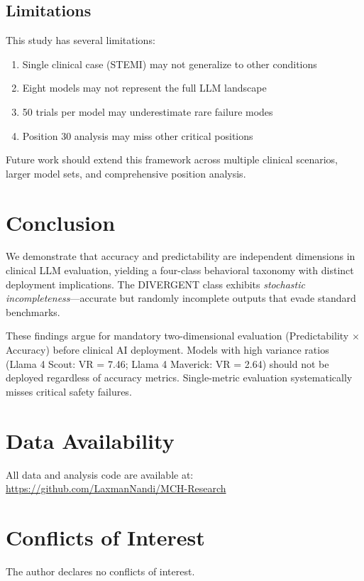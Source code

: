 \documentclass[11pt]{article}
\begin{document}
\subsection{Limitations}

This study has several limitations:
\begin{enumerate}
    \item Single clinical case (STEMI) may not generalize to other conditions
    \item Eight models may not represent the full LLM landscape
    \item 50 trials per model may underestimate rare failure modes
    \item Position 30 analysis may miss other critical positions
\end{enumerate}

Future work should extend this framework across multiple clinical scenarios, larger model sets, and comprehensive position analysis.

\section{Conclusion}

We demonstrate that accuracy and predictability are independent dimensions in clinical LLM evaluation, yielding a four-class behavioral taxonomy with distinct deployment implications. The DIVERGENT class exhibits \textit{stochastic incompleteness}---accurate but randomly incomplete outputs that evade standard benchmarks.

These findings argue for mandatory two-dimensional evaluation (Predictability $\times$ Accuracy) before clinical AI deployment. Models with high variance ratios (Llama 4 Scout: VR = 7.46; Llama 4 Maverick: VR = 2.64) should not be deployed regardless of accuracy metrics. Single-metric evaluation systematically misses critical safety failures.

\section*{Data Availability}

All data and analysis code are available at: \url{https://github.com/LaxmanNandi/MCH-Research}

\section*{Conflicts of Interest}

The author declares no conflicts of interest.
\end{document}
